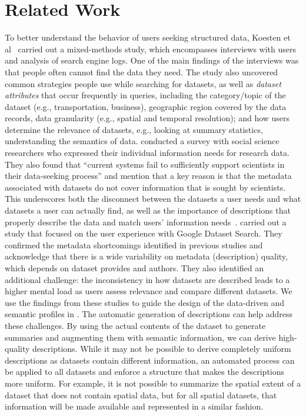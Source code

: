 \section{Related Work}
\label{sec:related_work}

To better understand the behavior of users seeking structured data, Koesten et al~\cite{koesten2017trials} carried out a mixed-methods study, which encompasses interviews with users and analysis of search engine logs. One of the main findings of the interviews was that people often cannot find the data they need. The study also uncovered common strategies people use while searching for datasets, as well as \emph{dataset attributes} that occur frequently in queries, including the category/topic of the dataset (e.g., transportation, business), geographic region covered by the data records, data granularity (e.g., spatial and temporal resolution); and how users determine the relevance of datasets, e.g., looking at summary statistics, understanding the semantics of data. \citet{papenmeier2021genuine} conducted a survey with social science
researchers who expressed their individual information needs for research data. They also found that ``current systems fail to sufficiently support scientists in their data-seeking process'' and mention that a key reason is that the metadata associated with datasets do not cover information that is sought by scientists. This underscores both the disconnect between the datasets a user needs and what datasets a user can actually find, as well as the importance of descriptions that properly describe the data and match users' information needs~\cite{chapman2020dataset}.
%
\citet{Sostek2024Discovering} carried out a study that focused on the user experience with Google Dataset Search. They confirmed the metadata shortcomings identified in previous studies and acknowledge that there is a wide variability on metadata (description) quality, which depends on dataset provides and authors. They also identified an additional challenge: the inconsistency in how datasets are described leads to a higher mental load as users assess relevance and compare different datasets. 
%
We use the findings from these studies to guide the design of the data-driven and semantic profiles in \SystemName. The automatic generation of descriptions can help address these challenges. By using the actual contents of the dataset to generate summaries and augmenting them with semantic information, we can derive high-quality descriptions. While it may not be possible to derive completely uniform descriptions as datasets contain different information, an automated process can be applied to all datasets and enforce a structure that makes the descriptions more uniform. For example, it is not possible to summarize the spatial extent of a dataset that does not contain spatial data, but for all spatial datasets, that information will be made available and represented in a similar fashion.


